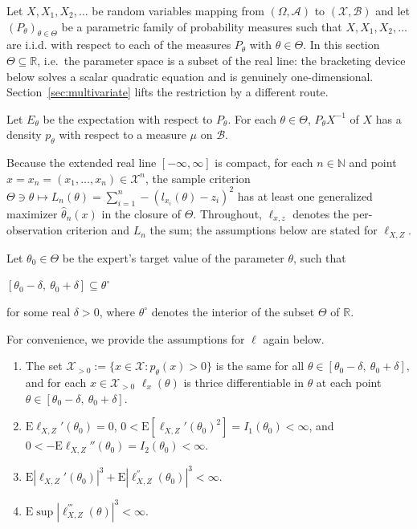 Let $X, X_1, X_2, \ldots$ be random variables mapping from $(\Omega, \mathcal{A})$ to $(\mathcal{X},\mathcal{B})$ and let $(P_{\theta})_{\theta\in \Theta}$ be a parametric family of probability measures such that $X, X_1, X_2, \ldots$ are i.i.d. with respect to each of the measures $P_{\theta}$ with $\theta \in \Theta$. In this section $\Theta\subseteq \mathbb{R}$, i.e.\ the parameter space is a subset of the real line: the bracketing device below solves a scalar quadratic equation and is genuinely one-dimensional. Section~\ref{sec:multivariate} lifts the restriction by a different route.

Let $E_{\theta}$ be the expectation with respect to $P_{\theta}$. For each $\theta\in \Theta$, $P_{\theta} X^{-1}$ of $X$ has a density $p_{\theta}$ with respect to a measure $\mu$ on $\mathcal{B}$.

Because the extended real line $[-\infty,\infty]$ is compact, for each $n\in \mathbb{N}$ and point $x=x_n=(x_1,\ldots,x_n)\in \mathcal{X}^n$, the sample criterion $\Theta\ni \theta\mapsto L_n(\theta) = \sum_{i=1}^n -(l_{x_i}(\theta)-z_i)^2 $ has at least one generalized maximizer $\hat{\theta}_n(x)$ in the closure of $\Theta$. Throughout, $\ell_{x,z}$ denotes the per-observation criterion and $L_n$ the sum; the assumptions below are stated for $\ell_{X,Z}$.

Let $\theta_{0}\in \Theta$ be the expert's target value of the parameter $\theta$, such that
\begin{center}
	$[\theta_{0}-\delta,\ \theta_{0}+\delta]\subseteq \theta^{\circ}$ 
\end{center}
for some real $\delta>0$, where $\theta^{\circ}$ denotes the interior of the subset $\Theta$ of $\mathbb{R}$.

For convenience, we provide the assumptions for $\ell$ again below.

\begin{enumerate}
	\item The set $\mathcal{X}_{>0} :=\{x\in \mathcal{X}:p_{\theta}(x)>0\}$ is the same for all $\theta\in [\theta_{0}-\delta,\ \theta_{0}+\delta],$ and for each $x\in \mathcal{X}_{>0}$ $\ell_{x}(\theta)$ is thrice differentiable in $\theta$ at each point $\theta\in [\theta_{0}-\delta,\ \theta_{0}+\delta].$
	\item $\mathrm{E}\ell_{X,Z}'(\theta_0)=0$, $0<\mathrm{E}[\ell_{X,Z}'(\theta_0)^2]=I_1(\theta_0)<\infty$, and $0<-\mathrm{E}\ell_{X,Z}''(\theta_0)=I_2(\theta_0)<\infty$.
	\item $\mathrm{E}|\ell_{X,Z}'(\theta_{0})|^{3}+\mathrm{E}|\ell_{X,Z}^{''}(\theta_{0})|^{3}<\infty.$
	\item $\mathrm{E} \sup |\ell_{X,Z}^{'''}(\theta)|^{3}<\infty.$
\end{enumerate}


